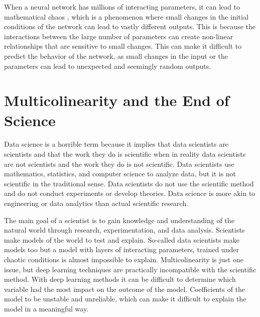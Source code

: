 When a neural network has millions of interacting parameters, it can lead to mathematical chaos , which is a phenomenon where small changes in the initial conditions of the network can lead to vastly different outputs. This is because the interactions between the large number of parameters can create non-linear relationships that are sensitive to small changes. This can make it difficult to predict the behavior of the network, as small changes in the input or the parameters can lead to unexpected and seemingly random outputs.

\section{Multicolinearity and the End of Science}

Data science is a horrible term because it implies that data scientists are scientists and that the work they do is scientific when in reality data scientists are not scientists and the work they do is not scientific. Data scientists use mathematics, statistics, and computer science to analyze data, but it is not scientific in the traditional sense. Data scientists do not use the scientific method and do not conduct experiments or develop theories. Data science is more akin to engineering or data analytics than actual scientific research.

The main goal of a scientist is to gain knowledge and understanding of the natural world through research, experimentation, and data analysis. Scientists make models of the world to test and explain. So-called data scientists make models too but a model with layers of interacting parameters, trained under chaotic conditions is almost impossible to explain. Multicolinearity is just one issue, but deep learning techniques are practically incompatible with the scientific method. With deep learning methods it can be difficult to determine which variable had the most impact on the outcome of the model. Coefficients of the model to be unstable and unreliable, which can make it difficult to explain the model in a meaningful way. 


